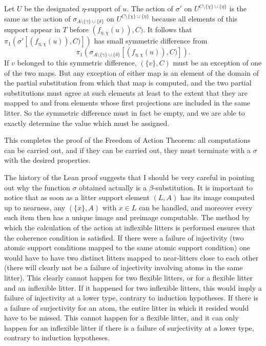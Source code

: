 \documentclass[12pt]{article}
\begin{document}
\begin{enumerate}
Let $U$ be the designated $\eta$-support of $u$.  The action of $\sigma'$ on $U^{C \setminus \{\chi\} \cup \{\eta\}}$ is the same as the action of $\sigma_{A \setminus \{\gamma\}\cup \{\delta\}}$ on $U^{C \setminus \{\chi\} \cup \{\eta\}}$ because all elements of this support appear in $T$ before $(f_{\eta,\chi}(u)),C)$.  It follows
that $\pi_1(\sigma'[(f_{\eta,\chi}(u)),C)])$ has small symmetric difference from $$\pi_1(\sigma_{A \setminus \{\gamma\}\cup \{\delta\}}[(f_{\eta,\chi}(u)),C)]).$$  If $v$ belonged to this symmetric difference, $(\{v\},C)$ must be an exception of one of the two maps.   But any exception of either map is an element of the domain
of the partial substitution from which that map is computed, and the two partial substitutions must agree at such elements at least to the extent that they are mapped to and from elements whose first projections are included in the same litter.  So the symmetric difference must in fact be empty, and we are able to exactly determine the value which must be assigned.

This completes the proof of the Freedom of Action Theorem:  all computations can be carried out, and if they can be carried out, they must terminate with a $\sigma$ with the desired properties.

The history of the Lean proof suggests that I should be very careful in pointing out why the function $\sigma$ obtained actually is a $\beta$-substitution.  It is important to notice that as soon as a litter support element $(L,A)$ has its image computed up to nearness, any $(\{x\},A)$ with $x \in L$ can be handled, and moreover every such item then has a unique image and preimage computable.  The method by which the calculation of the action at inflexible litters is performed ensures that the coherence condition is satisfied.
If there were a failure of injectivity (two atomic support conditions mapped to the same atomic support condition) one would have to have two distinct litters mapped to near-litters close to each other (there will clearly not be a failure of injectivity involving atoms in the same litter).  This clearly cannot happen for two flexible litters, or for a flexible litter and an inflexible litter.
If it happened for two inflexible litters, this would imply a failure of injectivity at a lower type, contrary to induction hypotheses.  If there is a failure of surjectivity for an atom, the entire litter in which it resided would have to be missed.  This cannot happen for a flexible litter, and it can only happen for an inflexible litter if there is a failure of surjectivity at a lower type, contrary to induction hypotheses.


\end{enumerate}
\end{document}

